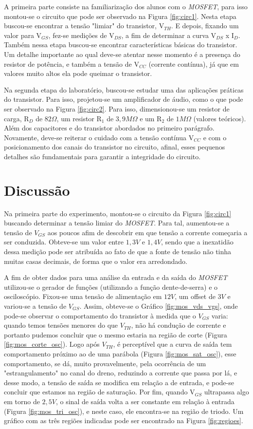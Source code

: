 \documentclass{article}
\begin{document}
A primeira parte consiste na familiarização dos alunos com o \emph{MOSFET}, para isso montou-se o circuito que pode ser observado na Figura \ref{fig:circ1}. Nesta etapa buscou-se encontrar a tensão "limiar" do transistor, V$_{TH}$. E depois, fixando um valor para V$_{GS}$, fez-se medições de V$_{DS}$, a fim de determinar a curva V$_{DS}$ x I$_D$. Também nessa etapa buscou-se encontrar características básicas do transistor. Um detalhe importante ao qual deve-se atentar nesse momento é a presença do resistor de potência, e também a tensão de V$_{CC}$ (corrente contínua), já que em valores muito altos ela pode queimar o transistor.

Na segunda etapa do laboratório, buscou-se estudar uma das aplicações práticas do transistor. Para isso, projetou-se um amplificador de áudio, como o que pode ser observado na Figura \ref{fig:circ2}. Para isso, dimensionou-se um resistor de carga, R$_D$ de $82\Omega$, um resistor R$_1$ de $3,9M\Omega$ e um R$_2$ de $1M\Omega$ (valores teóricos). Além dos capacitores e do transistor abordados no primeiro parágrafo. Novamente, deve-se reiterar o cuidado com a tensão contínua V$_{CC}$ e com o posicionamento dos canais do transistor no circuito, afinal, esses pequenos detalhes são fundamentais para garantir a integridade do circuito.

\section{Discussão}
Na primeira parte do experimento, montou-se o circuito da Figura \ref{fig:circ1} buscando determinar a tensão limiar do \emph{MOSFET}. Para tal, aumentou-se a tensão de $V_{GS}$ aos poucos afim de descobrir em que tensão a corrente começaria a ser conduzida. Obteve-se um valor entre $1,3V$ e $1,4V$, sendo que a inexatidão dessa medição pode ser atribuída ao fato de que a fonte de tensão não tinha muitas casas decimais, de forma que o valor era arredondado.

A fim de obter dados para uma análise da entrada e da saída do \emph{MOSFET} utilizou-se o gerador de funções (utilizando a função dente-de-serra) e o osciloscópio. Fixou-se uma tensão de alimentação em $12V$, um offset de $3V$ e variou-se a tensão de $V_{GS}$. Assim, obteve-se o Gráfico \ref{fig:mos_vds_vgs}, onde pode-se observar o comportamento do transistor à medida que o $V_{GS}$ varia: quando temos tensões menores do que $V_{TH}$, não há condução de corrente e portanto pudemos concluir que o mesmo estaria na região de corte (Figura \ref{fig:mos_corte_osc}). Logo após $V_{TH}$, é perceptível que a curva de saída tem comportamento próximo ao de uma parábola (Figura \ref{fig:mos_sat_osc}), esse comportamento, se dá, muito provavelmente, pela ocorrência de um "estrangulamento" no canal do dreno, reduzindo a corrente que passa por lá, e desse modo, a tensão de saída se modifica em relação a de entrada, e pode-se concluir que estamos na região de saturação. Por fim, quando V$_{GS}$ ultrapassa algo em torno de $2,5V$, o sinal de saída volta a ser constante em relação à entrada (Figura \ref{fig:mos_tri_osc}), e neste caso, ele encontra-se na região de triodo. Um gráfico com as três regiões indicadas pode ser encontrado na Figura \ref{fig:regioes}.
\end{document}
